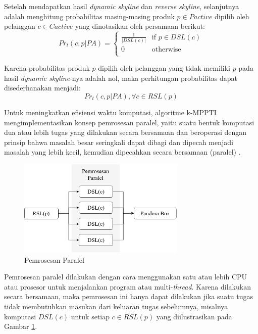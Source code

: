 \pagebreak
{}

Setelah mendapatkan hasil \textit{dynamic skyline} dan \textit{reverse skyline}, selanjutnya adalah menghitung probabilitas masing-masing produk $p \in P{active}$ dipilih oleh pelanggan $c \in C{active}$ yang dinotasikan oleh persamaan berikut:
\begin{equation}\label{eq:prob-ti}
Pr_t(c, p|PA) = \left\{
						\begin{array}{ll}
						\frac{1}{|DSL(c)|} & \text{if } p \in DSL(c)\\
						0 & \text{otherwise}\\
						\end{array}
						\right.
\end{equation}

Karena probabilitas produk $p$ dipilih oleh pelanggan yang tidak memiliki $p$ pada hasil \textit{dynamic skyline}-nya adalah nol, maka perhitungan probabilitas dapat disederhanakan menjadi:
\begin{equation}\label{eq:prob-ti-rsl}
Pr_t(c, p|PA), \forall c \in RSL(p)
\end{equation}


Untuk meningkatkan efisiensi waktu komputasi, algoritme k-MPPTI mengimplementasikan konsep pemrosesan paralel, yaitu suatu bentuk komputasi dua atau lebih tugas yang dilakukan secara bersamaan dan beroperasi dengan prinsip bahwa masalah besar seringkali dapat dibagi dan dipecah menjadi masalah yang lebih kecil, kemudian dipecahkan secara bersamaan (paralel) \cite{paralel}. 

\begin{figure}[h]
	\centering
	\includegraphics[width=8cm]{assets/img/bab3/paralel.png}
	\caption{Pemrosesan Paralel}
	\label{fig:paralel}
\end{figure}

Pemrosesan paralel dilakukan dengan cara menggunakan satu atau lebih CPU atau prosesor untuk menjalankan program atau multi-\textit{thread}. Karena dilakukan secara bersamaan, maka pemrosesan ini hanya dapat dilakukan jika suatu tugas tidak membutuhkan masukan dari keluaran tugas sebelumnya, misalnya komputasi $DSL(c)$ untuk setiap $c \in RSL(p)$ yang diilustrasikan pada Gambar \ref{fig:paralel}.

